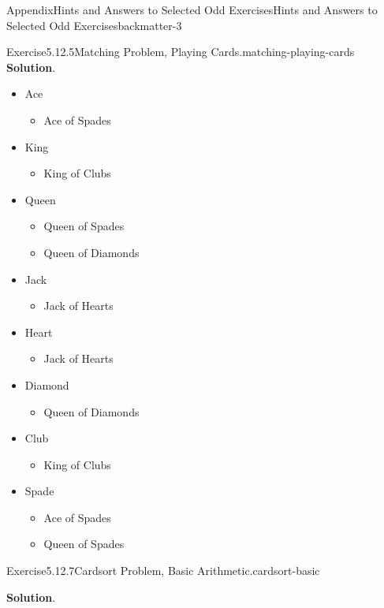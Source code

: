 \documentclass[oneside,10pt,]{book}
\newcommand{\blocktitlefont}{\relax}
\numberwithin{equation}{section}
\begin{document}
\begin{solutions-chapter}{Appendix}{Hints and Answers to Selected Odd Exercises}{}{Hints and Answers to Selected Odd Exercises}{}{}{backmatter-3}
\begin{divisionsolution}{Exercise}{5.12.5}{Matching Problem, Playing Cards.}{matching-playing-cards}
\noindent\textbf{\blocktitlefont Solution}.\hypertarget{matching-playing-cards-4-back}{}\quad{}%
\begin{itemize}[label=\textbullet]
\item{}Ace%
\begin{itemize}[label=$\circ$]
\item{}Ace of Spades%
\end{itemize}
%
\item{}King%
\begin{itemize}[label=$\circ$]
\item{}King of Clubs%
\end{itemize}
%
\item{}Queen%
\begin{itemize}[label=$\circ$]
\item{}Queen of Spades%
\item{}Queen of Diamonds%
\end{itemize}
%
\item{}Jack%
\begin{itemize}[label=$\circ$]
\item{}Jack of Hearts%
\end{itemize}
%
\item{}Heart%
\begin{itemize}[label=$\circ$]
\item{}Jack of Hearts%
\end{itemize}
%
\item{}Diamond%
\begin{itemize}[label=$\circ$]
\item{}Queen of Diamonds%
\end{itemize}
%
\item{}Club%
\begin{itemize}[label=$\circ$]
\item{}King of Clubs%
\end{itemize}
%
\item{}Spade%
\begin{itemize}[label=$\circ$]
\item{}Ace of Spades%
\item{}Queen of Spades%
\end{itemize}
%
\end{itemize}
%
\end{divisionsolution}%
\begin{divisionsolution}{Exercise}{5.12.7}{Cardsort Problem, Basic Arithmetic.}{cardsort-basic}%
\par\smallskip%
\noindent\textbf{\blocktitlefont Solution}.\hypertarget{cardsort-basic-4-back}{}\quad{}%

\end{divisionsolution}
\end{solutions-chapter}
\end{document}

